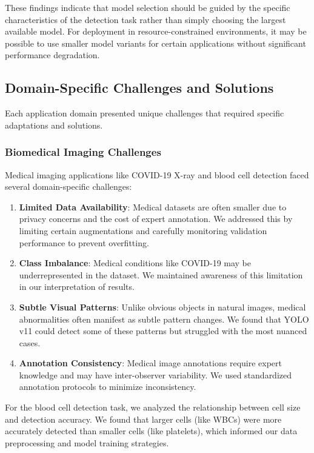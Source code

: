 \begin{multicols}{2}
These findings indicate that model selection should be guided by the specific characteristics of the detection task rather than simply choosing the largest available model. For deployment in resource-constrained environments, it may be possible to use smaller model variants for certain applications without significant performance degradation.

\subsection{Domain-Specific Challenges and Solutions}

Each application domain presented unique challenges that required specific adaptations and solutions.

\subsubsection{Biomedical Imaging Challenges}

Medical imaging applications like COVID-19 X-ray and blood cell detection faced several domain-specific challenges:

\begin{enumerate}
    \item \textbf{Limited Data Availability}: Medical datasets are often smaller due to privacy concerns and the cost of expert annotation. We addressed this by limiting certain augmentations and carefully monitoring validation performance to prevent overfitting.
    
    \item \textbf{Class Imbalance}: Medical conditions like COVID-19 may be underrepresented in the dataset. We maintained awareness of this limitation in our interpretation of results.
    
    \item \textbf{Subtle Visual Patterns}: Unlike obvious objects in natural images, medical abnormalities often manifest as subtle pattern changes. We found that YOLO v11 could detect some of these patterns but struggled with the most nuanced cases.
    
    \item \textbf{Annotation Consistency}: Medical image annotations require expert knowledge and may have inter-observer variability. We used standardized annotation protocols to minimize inconsistency.
\end{enumerate}

For the blood cell detection task, we analyzed the relationship between cell size and detection accuracy. We found that larger cells (like WBCs) were more accurately detected than smaller cells (like platelets), which informed our data preprocessing and model training strategies.


\end{multicols}
